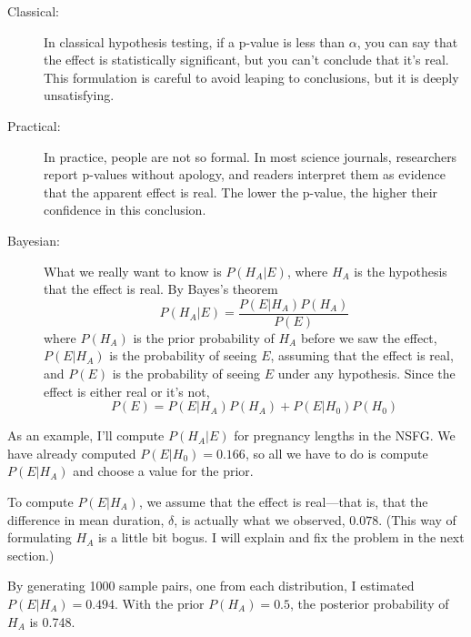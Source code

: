 \documentclass[12pt]{book}
\begin{document}
\begin{description}

\item[Classical:] In classical hypothesis testing, if a p-value
  is less than $\alpha$, you can say that the effect is statistically
  significant, but you can't conclude that it's real.  This
  formulation is careful to avoid leaping to conclusions, but it is
  deeply unsatisfying.

\item[Practical:] In practice, people are not so formal.  In most
  science journals, researchers report p-values without apology, and
  readers interpret them as evidence that the apparent effect is real.
  The lower the p-value, the higher their confidence in this
  conclusion.


\item[Bayesian:] What we really want to know is $P(H_A | E)$, where
  $H_A$ is the hypothesis that the effect is real.  By Bayes's theorem
  \[ P(H_A | E) = \frac{P(E | H_A) P(H_A)}{P(E)} \]
  where $P(H_A)$ is the prior probability of $H_A$ before we saw the
  effect, $P(E | H_A)$ is the probability of seeing $E$, assuming that
  the effect is real, and $P(E)$ is the probability of seeing $E$
  under any hypothesis.  Since the effect is either real or it's not,
  \[ P(E) = P(E | H_A) P(H_A) + P(E | H_0) P(H_0) \]

\end{description}

As an example, I'll compute $P(H_A | E)$ for pregnancy lengths in the
NSFG.  We have already computed $P(E | H_0)=0.166$, so all we have to
do is compute $P(E | H_A)$ and choose a value for the prior.



To compute $P(E | H_A)$, we assume that the effect is real---that is,
that the difference in mean duration, $\delta$, is actually what we
observed, $0.078$.  (This way of formulating $H_A$ is a little bit
bogus.  I will explain and fix the problem in the next section.)

By generating 1000 sample pairs, one from each
distribution, I estimated $P(E | H_A) = 0.494$.  With the prior
$P(H_A)=0.5$, the posterior probability of $H_A$ is 0.748.

\end{document}
